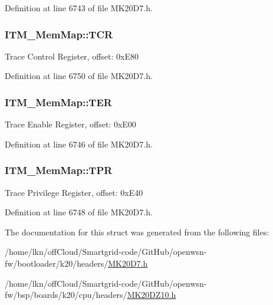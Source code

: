 Definition at line 6743 of file M\+K20\+D7.\+h.

\subsubsection[{\texorpdfstring{T\+CR}{TCR}}]{ I\+T\+M\+\_\+\+Mem\+Map\+::\+T\+CR}\hypertarget{struct_i_t_m___mem_map_a9dceb31807fae649d751a78f490383d8}{}\label{struct_i_t_m___mem_map_a9dceb31807fae649d751a78f490383d8}
Trace Control Register, offset\+: 0x\+E80 

Definition at line 6750 of file M\+K20\+D7.\+h.

\subsubsection[{\texorpdfstring{T\+ER}{TER}}]{ I\+T\+M\+\_\+\+Mem\+Map\+::\+T\+ER}\hypertarget{struct_i_t_m___mem_map_a661efbaf7200441e036619587dabaeb0}{}\label{struct_i_t_m___mem_map_a661efbaf7200441e036619587dabaeb0}
Trace Enable Register, offset\+: 0x\+E00 

Definition at line 6746 of file M\+K20\+D7.\+h.

\subsubsection[{\texorpdfstring{T\+PR}{TPR}}]{ I\+T\+M\+\_\+\+Mem\+Map\+::\+T\+PR}\hypertarget{struct_i_t_m___mem_map_a24ac79f5d070330282c6c0feae3cbcc1}{}\label{struct_i_t_m___mem_map_a24ac79f5d070330282c6c0feae3cbcc1}
Trace Privilege Register, offset\+: 0x\+E40 

Definition at line 6748 of file M\+K20\+D7.\+h.



The documentation for this struct was generated from the following files\+:\begin{DoxyCompactItemize}
\item 
/home/lkn/off\+Cloud/\+Smartgrid-\/code/\+Git\+Hub/openwsn-\/fw/bootloader/k20/headers/\hyperlink{bootloader_2k20_2headers_2_m_k20_d7_8h}{M\+K20\+D7.\+h}\item 
/home/lkn/off\+Cloud/\+Smartgrid-\/code/\+Git\+Hub/openwsn-\/fw/bsp/boards/k20/cpu/headers/\hyperlink{_m_k20_d_z10_8h}{M\+K20\+D\+Z10.\+h}\end{DoxyCompactItemize}
